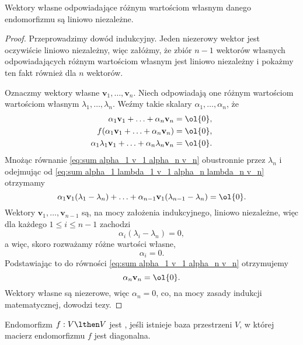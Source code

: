 \begin{lemma}
    \label{l:eigenvectors are linearly independent}
    Wektory własne odpowiadające różnym wartościom własnym danego endomorfizmu są liniowo niezależne.
\end{lemma}
\begin{proof}
    Przeprowadzimy dowód indukcyjny. Jeden niezerowy wektor jest oczywiście liniowo niezależny, więc załóżmy, że zbiór $n-1$ wektorów własnych odpowiadających różnym wartościom własnym jest liniowo niezależny i pokażmy ten fakt również dla $n$ wektorów.

    Oznaczmy wektory własne $\mathbf{v}_1, \ldots, \mathbf{v}_n$. Niech odpowiadają one różnym wartościom wartościom własnym $\lambda_1, \ldots, \lambda_n$. Weźmy takie skalary $\alpha_1, \ldots, \alpha_n$, że
    \begin{align}
        \alpha_1\mathbf{v}_1 + \ldots + \alpha_n\mathbf{v}_n &= \ol{0},
            \label{eq:sum alpha_1 v_1 alpha_n v_n} \\
        f(\alpha_1\mathbf{v}_1 + \ldots + \alpha_n\mathbf{v}_n) &= \ol{0}, \nonumber \\
        \alpha_1\lambda_1\mathbf{v}_1 + \ldots + \alpha_n\lambda_n\mathbf{v}_n &= \ol{0}.
            \label{eq:sum alpha_1 lambda_1 v_1 alpha_n lambda_n v_n}
    \end{align}
    Mnożąc równanie \ref{eq:sum alpha_1 v_1 alpha_n v_n} obustronnie przez $\lambda_n$ i odejmując od \ref{eq:sum alpha_1 lambda_1 v_1 alpha_n lambda_n v_n} otrzymamy
    \[ \alpha_1\mathbf{v}_1(\lambda_1 - \lambda_n) + \ldots + \alpha_{n-1}\mathbf{v}_1(\lambda_{n-1} - \lambda_n) = \ol{0}. \]
    Wektory $\mathbf{v}_1, \ldots, \mathbf{v}_{n-1}$ są, na mocy założenia indukcyjnego, liniowo niezależne, więc dla każdego $1 \leq i \leq n-1$ zachodzi
    \[ \alpha_i(\lambda_i - \lambda_n) = 0, \]
    a więc, skoro rozważamy różne wartości własne,
    \[ \alpha_i = 0. \]
    Podstawiając to do równości \ref{eq:sum alpha_1 v_1 alpha_n v_n} otrzymujemy
    \[ \alpha_n\mathbf{v}_n = \ol{0}. \]
    Wektory własne są niezerowe, więc $\alpha_n = 0$, co, na mocy zasady indukcji matematycznej, dowodzi tezy.
\end{proof}

\begin{definition}
    Endomorfizm $f : V \lthen V$ jest , jeśli istnieje baza przestrzeni $V$, w której macierz endomorfizmu $f$ jest diagonalna.
\end{definition}

